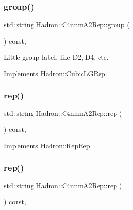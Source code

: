 \subsubsection{\texorpdfstring{group()}{group()}\hspace{0.1cm}{\footnotesize\ttfamily [5/5]}}
{\footnotesize\ttfamily std\+::string Hadron\+::\+C4nnm\+A2\+Rep\+::group (\begin{DoxyParamCaption}{ }\end{DoxyParamCaption}) const\hspace{0.3cm}{\ttfamily [inline]}, {\ttfamily [virtual]}}

Little-\/group label, like D2, D4, etc. 

Implements \mbox{\hyperlink{structHadron_1_1CubicLGRep_a9bdb14b519a611d21379ed96a3a9eb41}{Hadron\+::\+Cubic\+L\+G\+Rep}}.

\mbox{\label{structHadron_1_1C4nnmA2Rep_a087273219d3b72971b2891ff00719c5a}} 
\subsubsection{\texorpdfstring{rep()}{rep()}\hspace{0.1cm}{\footnotesize\ttfamily [1/5]}}
{\footnotesize\ttfamily std\+::string Hadron\+::\+C4nnm\+A2\+Rep\+::rep (\begin{DoxyParamCaption}{ }\end{DoxyParamCaption}) const\hspace{0.3cm}{\ttfamily [inline]}, {\ttfamily [virtual]}}



Implements \mbox{\hyperlink{structHadron_1_1RepRep_ab3213025f6de249f7095892109575fde}{Hadron\+::\+Rep\+Rep}}.

\mbox{\label{structHadron_1_1C4nnmA2Rep_a087273219d3b72971b2891ff00719c5a}} 
\subsubsection{\texorpdfstring{rep()}{rep()}\hspace{0.1cm}{\footnotesize\ttfamily [2/5]}}
{\footnotesize\ttfamily std\+::string Hadron\+::\+C4nnm\+A2\+Rep\+::rep (\begin{DoxyParamCaption}{ }\end{DoxyParamCaption}) const\hspace{0.3cm}{\ttfamily [inline]}, {\ttfamily [virtual]}}



